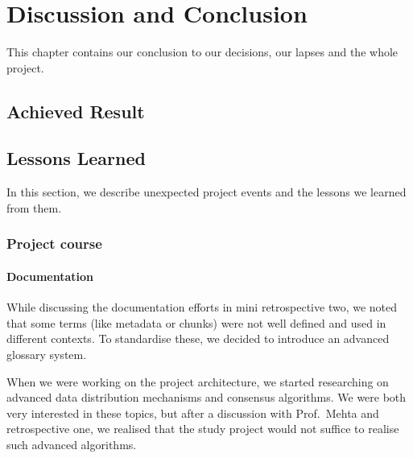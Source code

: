 \chapter{Discussion and Conclusion}
\label{sec:discussion-and-conclusion}

This chapter contains our conclusion to our decisions, our lapses and the whole project.

\section{Achieved Result}

\section{Lessons Learned}

In this section, we describe unexpected project events and the lessons we learned from them.

\subsection{Project course}
\subsubsection{Documentation}
While discussing the documentation efforts in mini retrospective two, we noted that some terms (like metadata or chunks) were not well defined and used in different contexts. To standardise these, we decided to introduce an advanced glossary system.

When we were working on the project architecture, we started researching on advanced data distribution mechanisms and consensus algorithms. We were both very interested in these topics, but after a discussion with Prof.~Mehta and retrospective one, we realised that the study project would not suffice to realise such advanced algorithms.

